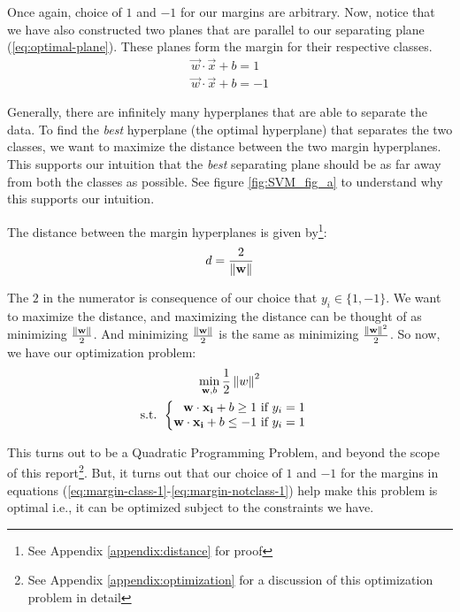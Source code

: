 Once again, choice of $1$ and $-1$ for our margins are arbitrary. Now, notice that we have also constructed two planes that are parallel to our separating plane (\ref{eq:optimal-plane}). These planes form the margin for their respective classes.
\begin{gather}
\vec{w}\cdot\vec{x} + b = 1 \label{eq:margin-class-1} \\
\vec{w}\cdot\vec{x} + b = -1 \label{eq:margin-notclass-1}
\end{gather}

Generally, there are infinitely many hyperplanes that are able to separate the data. To find the \textit{best} hyperplane (the optimal hyperplane) that separates the two classes, we want to maximize the distance between the two margin hyperplanes. This supports our intuition that the \textit{best} separating plane should be as far away from both the classes as possible. See figure \ref{fig:SVM_fig_a} to understand why this supports our intuition.

The distance between the margin hyperplanes is given by\footnote{See Appendix \ref{appendix:distance} for proof}:
\begin{equation}
d = \frac{2}{\left\lVert\mathbf{w}\right\rVert} \label{eq:margin-dist}
\end{equation}

The $2$ in the numerator is consequence of our choice that $y_i \in \{1, -1\}$. We want to maximize the distance, and maximizing the distance can be thought of as minimizing $\frac{\left\lVert\mathbf{w}\right\rVert}{2}$. And minimizing $\frac{\left\lVert\mathbf{w}\right\rVert}{2}$ is the same as minimizing $\frac{\left\lVert\mathbf{w}\right\rVert^2}{2}$. So now, we have our optimization problem:
\begin{gather}
	\min_{\mathbf{w}, b} \frac{1}{2}\left\lVert w\right\rVert^2 \nonumber\\
	\text{s.t. }
	\begin{cases}
	\begin{aligned}
		\mathbf{w}\cdot\mathbf{x_i} + b \geq 1 \text{ if $y_i = 1$} \nonumber\\
		\mathbf{w}\cdot\mathbf{x_i} + b \leq -1 \text{ if $y_i = 1$} \nonumber
	\end{aligned}
	\end{cases}
\end{gather}

This turns out to be a Quadratic Programming Problem, and beyond the scope of this report\footnote{See Appendix \ref{appendix:optimization} for a discussion of this optimization problem in detail}. But, it turns out that our choice of $1$ and $-1$ for the margins in equations (\ref{eq:margin-class-1}-\ref{eq:margin-notclass-1}) help make this problem is optimal i.e., it can be optimized subject to the constraints we have.

